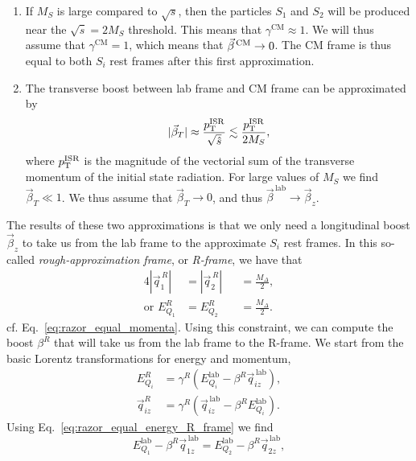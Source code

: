 \begin{enumerate}
  \item If $M_S$ is large compared to $\sqrt{s}$, then the particles $S_1$ and $S_2$ will be
produced near the $\sqrt{\hat{s}} = 2 M_S$ threshold. This means that $\gamma^{\textrm{CM}} \approx
1$. We will thus assume that $\gamma^{\textrm{CM}} = 1$, which means that $\vec{\beta}^{\,\textrm{CM}} \rightarrow 0$. 
The CM frame is thus equal to both $S_i$ rest frames after this first approximation. 
  \item The transverse boost between lab frame and CM frame can be approximated by 
  \begin{equation}
    |\vec{\beta}_T| \approx \frac{p_{\mathrm{T}}^{\rm ISR}}{\sqrt{\hat{s}}} \lesssim \frac{p_{\mathrm{T}}^{\rm
ISR}}{2M_S},
  \end{equation}
  where $p_{\mathrm{T}}^{\rm ISR}$ is the magnitude of the vectorial sum of the transverse momentum of the
initial state radiation. For large values of $M_S$ we find $\vec{\beta}_T \ll 1$. We thus assume
that $\vec{\beta}_T \rightarrow 0$, and thus $\vec{\beta}^{\,\textrm{lab}} \rightarrow
\vec{\beta}_z$.
\end{enumerate}
The results of these two approximations is that we only need a longitudinal boost $\vec{\beta}_z$
to take us from the lab frame to the approximate $S_i$ rest frames. 
In this so-called \textit{rough-approximation frame}, or \textit{R-frame}, we have that
\begin{alignat}{4}
  |\vec{q}^{\,R}_1|         &= |\vec{q}^{\,R}_2| &&= \frac{M_\Delta}{2} , \\
  \textrm{or } E_{Q_1}^R &= E_{Q_2}^R     &&= \frac{M_\Delta}{2}.
\label{eq:razor_equal_energy_R_frame}
\end{alignat}
cf. Eq.~\ref{eq:razor_equal_momenta}. Using this constraint, we can compute the boost $\beta^R$
that will take us from the lab frame to the R-frame. We start from the basic Lorentz
transformations for energy and momentum, 
\begin{align}
  E_{Q_i}^R      &= \gamma^R \left( E_{Q_i}^{\textrm{lab}} - \beta^R \vec{q}_{iz}^{\,\textrm{lab}}
\right) , \\
  \vec{q}_{iz}^R &= \gamma^R \left( \vec{q}_{iz}^{\,\textrm{lab}} - \beta^R E_{Q_i}^{\textrm{lab}}
\right) .
\end{align}
Using Eq.~\ref{eq:razor_equal_energy_R_frame} we find
\begin{equation}
  E_{Q_1}^{\textrm{lab}} - \beta^R \vec{q}_{1z}^{\,\textrm{lab}} = E_{Q_2}^{\textrm{lab}} - \beta^R
\vec{q}_{2z}^{\,\textrm{lab}} ,
\end{equation}
